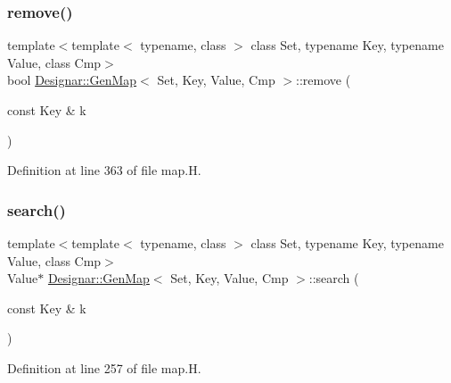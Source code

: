 \subsubsection{\texorpdfstring{remove()}{remove()}}
{\footnotesize\ttfamily template$<$template$<$ typename, class $>$ class Set, typename Key, typename Value, class Cmp$>$ \\
bool \hyperlink{class_designar_1_1_gen_map}{Designar\+::\+Gen\+Map}$<$ Set, Key, Value, Cmp $>$\+::remove (\begin{DoxyParamCaption}\item[{const Key \&}]{k }\end{DoxyParamCaption})\hspace{0.3cm}{\ttfamily [inline]}}



Definition at line 363 of file map.\+H.

\mbox{\label{class_designar_1_1_gen_map_a6a0eb4fe87d7bcc739f6394d5fd8952e}} 
\subsubsection{\texorpdfstring{search()}{search()}\hspace{0.1cm}{\footnotesize\ttfamily [1/4]}}
{\footnotesize\ttfamily template$<$template$<$ typename, class $>$ class Set, typename Key, typename Value, class Cmp$>$ \\
Value$\ast$ \hyperlink{class_designar_1_1_gen_map}{Designar\+::\+Gen\+Map}$<$ Set, Key, Value, Cmp $>$\+::search (\begin{DoxyParamCaption}\item[{const Key \&}]{k }\end{DoxyParamCaption})\hspace{0.3cm}{\ttfamily [inline]}}



Definition at line 257 of file map.\+H.

\mbox{\label{class_designar_1_1_gen_map_a1c3b2c788cc8c1a7b59e5afb66fffca4}} 
